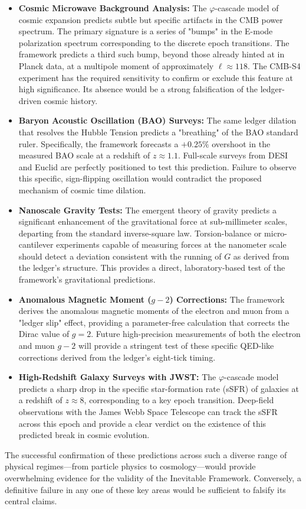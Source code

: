 \documentclass[11pt,a4paper]{article}
\begin{document}
\begin{itemize}
    \item \textbf{Cosmic Microwave Background Analysis:} The \(\varphi\)-cascade model of cosmic expansion predicts subtle but specific artifacts in the CMB power spectrum. The primary signature is a series of "bumps" in the E-mode polarization spectrum corresponding to the discrete epoch transitions. The framework predicts a third such bump, beyond those already hinted at in Planck data, at a multipole moment of approximately \(\ell \approx 118\). The CMB-S4 experiment has the required sensitivity to confirm or exclude this feature at high significance. Its absence would be a strong falsification of the ledger-driven cosmic history.

    \item \textbf{Baryon Acoustic Oscillation (BAO) Surveys:} The same ledger dilation that resolves the Hubble Tension predicts a "breathing" of the BAO standard ruler. Specifically, the framework forecasts a \(+0.25\%\) overshoot in the measured BAO scale at a redshift of \(z \approx 1.1\). Full-scale surveys from DESI and Euclid are perfectly positioned to test this prediction. Failure to observe this specific, sign-flipping oscillation would contradict the proposed mechanism of cosmic time dilation.

    \item \textbf{Nanoscale Gravity Tests:} The emergent theory of gravity predicts a significant enhancement of the gravitational force at sub-millimeter scales, departing from the standard inverse-square law. Torsion-balance or micro-cantilever experiments capable of measuring forces at the nanometer scale should detect a deviation consistent with the running of \(G\) as derived from the ledger's structure. This provides a direct, laboratory-based test of the framework's gravitational predictions.

    \item \textbf{Anomalous Magnetic Moment (\(g-2\)) Corrections:} The framework derives the anomalous magnetic moments of the electron and muon from a "ledger slip" effect, providing a parameter-free calculation that corrects the Dirac value of \(g=2\). Future high-precision measurements of both the electron and muon \(g-2\) will provide a stringent test of these specific QED-like corrections derived from the ledger's eight-tick timing.

    \item \textbf{High-Redshift Galaxy Surveys with JWST:} The \(\varphi\)-cascade model predicts a sharp drop in the specific star-formation rate (sSFR) of galaxies at a redshift of \(z \approx 8\), corresponding to a key epoch transition. Deep-field observations with the James Webb Space Telescope can track the sSFR across this epoch and provide a clear verdict on the existence of this predicted break in cosmic evolution.
\end{itemize}
The successful confirmation of these predictions across such a diverse range of physical regimes—from particle physics to cosmology—would provide overwhelming evidence for the validity of the Inevitable Framework. Conversely, a definitive failure in any one of these key areas would be sufficient to falsify its central claims.
\end{document}
